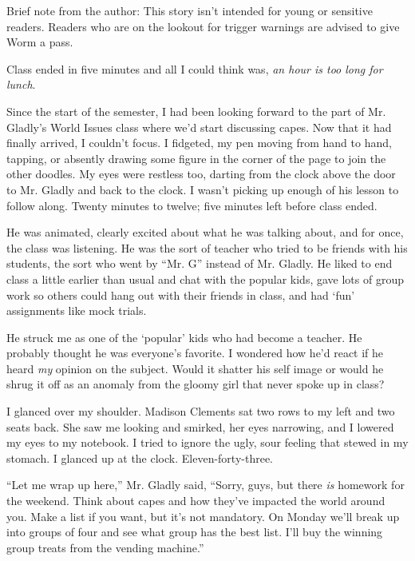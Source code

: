 





Brief note from the author:  This story isn't intended for young or sensitive readers.  Readers who are on the lookout for trigger warnings are advised to give Worm a pass.



\sectionbreak



Class ended in five minutes and all I could think was, \emph{an hour is too long for lunch}.



Since the start of the semester, I had been looking forward to the part of Mr. Gladly's World Issues class where we'd start discussing capes.  Now that it had finally arrived, I couldn't focus.  I fidgeted, my pen moving from hand to hand, tapping, or absently drawing some figure in the corner of the page to join the other doodles.  My eyes were restless too, darting from the clock above the door to Mr. Gladly and back to the clock.  I wasn't picking up enough of his lesson to follow along.  Twenty minutes to twelve; five minutes left before class ended.



He was animated, clearly excited about what he was talking about, and for once, the class was listening.  He was the sort of teacher who tried to be friends with his students, the sort who went by ``Mr. G'' instead of Mr. Gladly.  He liked to end class a little earlier than usual and chat with the popular kids, gave lots of group work so others could hang out with their friends in class, and had `fun' assignments like mock trials.



He struck me as one of the `popular' kids who had become a teacher.  He probably thought he was everyone's favorite.  I wondered how he'd react if he heard \emph{my} opinion on the subject.  Would it shatter his self image or would he shrug it off as an anomaly from the gloomy girl that never spoke up in class?



I glanced over my shoulder.  Madison Clements sat two rows to my left and two seats back.  She saw me looking and smirked, her eyes narrowing, and I lowered my eyes to my notebook.  I tried to ignore the ugly, sour feeling that stewed in my stomach.  I glanced up at the clock.  Eleven-forty-three.



``Let me wrap up here,'' Mr. Gladly said, ``Sorry, guys, but there \emph{is} homework for the weekend.  Think about capes and how they've impacted the world around you.  Make a list if you want, but it's not mandatory.  On Monday we'll break up into groups of four and see what group has the best list.  I'll buy the winning group treats from the vending machine.''



